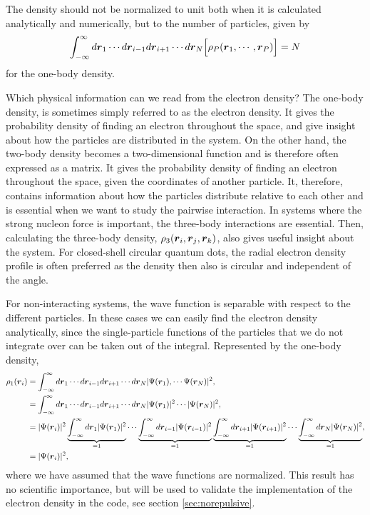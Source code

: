 The density should not be normalized to unit both when it is calculated analytically and numerically, but to the number of particles, given by
\begin{equation}
\int_{-\infty}^{\infty}d\boldsymbol{{r}}_{1}\cdots d\boldsymbol{{r}}_{i-1}d\boldsymbol{{r}}_{i+1}\cdots d\boldsymbol{{r}}_N\Big[\rho_P(\boldsymbol{{r}}_1,\cdots,\boldsymbol{{r}}_P)\Big]=N
\end{equation}
for the one-body density.

Which physical information can we read from the electron density? The one-body density, is sometimes simply referred to as the electron density. It gives the probability density of finding an electron throughout the space, and give insight about how the particles are distributed in the system. On the other hand, the two-body density becomes a two-dimensional function and is therefore often expressed as a matrix. It gives the probability density of finding an electron throughout the space, given the coordinates of another particle. It, therefore, contains information about how the particles distribute relative to each other and is essential when we want to study the pairwise interaction. In systems where the strong nucleon force is important, the three-body interactions are essential. Then, calculating the three-body density, $\rho_3(\boldsymbol{{r}}_i, \boldsymbol{{r}}_j, \boldsymbol{{r}}_k)$, also gives useful insight about the system. For closed-shell circular quantum dots, the radial electron density profile is often preferred as the density then also is circular and independent of the angle. 

For non-interacting systems, the wave function is separable with respect to the different particles. In these cases we can easily find the electron density analytically, since the single-particle functions of the particles that we do not integrate over can be taken out of the integral. Represented by the one-body density, 
\begin{equation}
\begin{aligned}
\rho_1(\boldsymbol{{r}}_i)&=\int_{-\infty}^{\infty}d\boldsymbol{{r}}_{1}\cdots d\boldsymbol{{r}}_{i-1}d\boldsymbol{{r}}_{i+1}\cdots d\boldsymbol{{r}}_N |\Psi(\boldsymbol{{r}}_1),\cdots \Psi(\boldsymbol{{r}}_N)|^2,\\
&=\int_{-\infty}^{\infty}d\boldsymbol{{r}}_{1}\cdots d\boldsymbol{{r}}_{i-1}d\boldsymbol{{r}}_{i+1}\cdots d\boldsymbol{{r}}_N |\Psi(\boldsymbol{{r}}_1)|^2\cdots |\Psi(\boldsymbol{{r}}_N)|^2,\\
&=|\Psi(\boldsymbol{{r}}_i)|^2\underbrace{\int_{-\infty}^{\infty}d\boldsymbol{{r}}_{1}|\Psi(\boldsymbol{{r}}_{1})|^2}_{=1}\cdots\underbrace{\int_{-\infty}^{\infty}d\boldsymbol{{r}}_{i-1}|\Psi(\boldsymbol{{r}}_{i-1})|^2}_{=1}\underbrace{\int_{-\infty}^{\infty}d\boldsymbol{{r}}_{i+1}|\Psi(\boldsymbol{{r}}_{i+1})|^2}_{=1}\cdots\underbrace{\int_{-\infty}^{\infty}d\boldsymbol{{r}}_{N}|\Psi(\boldsymbol{{r}}_{N})|^2}_{=1},\\
&=|\Psi(\boldsymbol{{r}}_i)|^2,
\end{aligned}
\end{equation}
where we have assumed that the wave functions are normalized. This result has no scientific importance, but will be used to validate the implementation of the electron density in the code, see section \ref{sec:norepulsive}.


